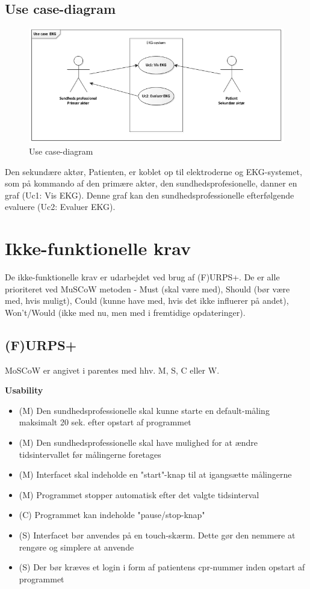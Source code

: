 \subsection{Use case-diagram}

\begin{figure}[htb]
	\centering
	\includegraphics[width=1\textwidth]{Figurer/Snip20150226_2}
	\caption{Use case-diagram}
	\label{fig:Use Cases}
\end{figure}

Den sekundære aktør, Patienten, er koblet op til elektroderne og EKG-systemet, som på kommando af den primære aktør, den sundhedsprofesionelle, danner en graf (Uc1: Vis EKG). Denne graf kan den sundhedsprofessionelle efterfølgende evaluere (Uc2: Evaluer EKG).

\section{Ikke-funktionelle krav}
De ikke-funktionelle krav er udarbejdet ved brug af (F)URPS+. De er alle prioriteret ved MuSCoW metoden - Must (skal være med), Should (bør være med, hvis muligt), Could (kunne have med, hvis det ikke influerer på andet), Won't/Would (ikke med nu, men med i fremtidige opdateringer). 

\subsection{(F)URPS+}
MoSCoW er angivet i parentes med hhv. M, S, C eller W.

\textbf{Usability}
\begin{itemize}
	\item (M) Den sundhedsprofessionelle skal kunne starte en default-måling maksimalt 20 sek. efter opstart af programmet
	\item (M) Den sundhedsprofessionelle skal have mulighed for at ændre tidsintervallet før målingerne foretages
	\item (M) Interfacet skal indeholde en "start"-knap til at igangsætte målingerne
	\item (M) Programmet stopper automatisk efter det valgte tidsinterval
	\item (C) Programmet kan indeholde "pause/stop-knap"
	\item (S) Interfacet bør anvendes på en touch-skærm. Dette gør den nemmere at rengøre og simplere at anvende
	\item (S) Der bør kræves et login i form af patientens cpr-nummer inden opstart af programmet
\end{itemize}


